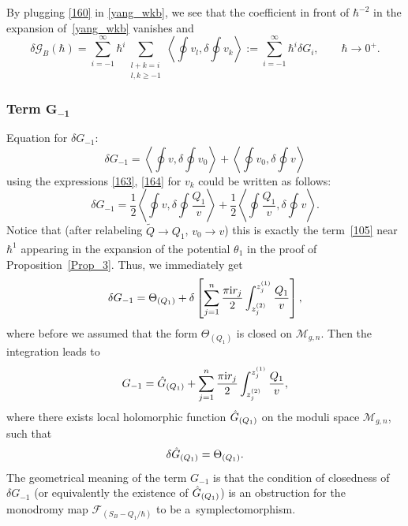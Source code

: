 \documentclass[pdftex]{sigma}
\numberwithin{equation}{section}
\theoremstyle{definition}
\begin{document}
By plugging \eqref{160} in \eqref{yang_wkb}, we see that the coefficient in front of $\hbar^{-2}$ in the expansion of~\eqref{yang_wkb} vanishes and
\begin{equation*}%
\delta \mathcal{G}_B(\hbar) =\sum^{\infty}_{i=-1}\hbar^i \sum_{\substack {l+k=i \\ l,k\geq -1}}\left\langle \oint v_l, \delta \oint v_k \right\rangle := \sum^{\infty}_{i=-1} \hbar^i \delta G_i, \qquad \hbar \xrightarrow[]{} 0^+.
\end{equation*}

\subsubsection[Term G\_\{-1\}]{Term $\boldsymbol{G_{-1}}$}

Equation for $\delta G_{-1}$:
 \begin{equation*}%
 \delta G_{-1}=\left\langle \oint v,\delta \oint v_0\right\rangle +\left\langle \oint v_0,\delta \oint v\right\rangle \end{equation*}
using the expressions \eqref{163}, \eqref{164} for $v_k$ could be written as follows:
 \begin{equation*}
 \delta G_{-1}=\frac{1}{2}\left\langle \oint v, \delta \oint \frac{Q_1}{v}\right\rangle +\frac{1}{2}\left\langle \oint \frac{Q_1}{v}, \delta \oint v\right\rangle.
 \end{equation*}
Notice that (after relabeling $\tilde{Q} \xrightarrow[]{} Q_1$, $v_0 \xrightarrow[]{} v$) this is exactly the term~\eqref{105} near $\hbar^1$ appearing in the expansion of the potential $\theta_1$ in the proof of Proposition~\ref{Prop_3}. Thus, we immediately get
\begin{equation*}%
\delta G_{-1} =\Theta_{(Q_1)}+\delta\left[\sum^n_{j=1}\frac{\pi{\rm i} r_j}{2}
\int^{z^{(1)}_j}_{z^{(2)}_j}\frac{{Q}_1}{v} \right],
\end{equation*}
where before we assumed that the form $ \Theta_{(Q_1)}$ is closed on $\mathcal{M}_{g,n}$.
Then the integration leads to%
\begin{equation*}%
G_{-1} =\Hat{G}_{(Q_1)}+\sum^n_{j=1}\frac{\pi{\rm i} r_j}{2}
\int^{z^{(1)}_j}_{z^{(2)}_j}\frac{{Q}_1}{v} ,
\end{equation*}
where there exists local holomorphic function $\Hat{G}_{(Q_1)}$ on the moduli space $\mathcal{M}_{g,n}$, such that
\begin{equation} \label{funG} \delta\Hat{G}_{(Q_1)}= \Theta_{(Q_1)}.\end{equation}
The geometrical meaning of the term $G_{-1}$ is that the condition of closedness of $\delta G_{-1}$ (or equivalently the existence of $\Hat{G}_{(Q_1)}$) is an obstruction for the monodromy map $\mathcal{F}_{(S_B-{Q_1}/{\hbar})}$ to be a~symplectomorphism.
\end{document}
